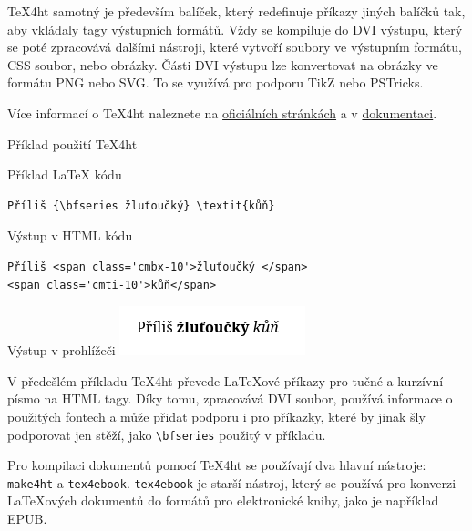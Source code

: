 \TeX4ht samotný je především balíček, který redefinuje příkazy jiných balíčků tak, aby
vkládaly tagy výstupních formátů. Vždy se kompiluje do DVI výstupu, který se poté zpracovává
dalšími nástroji, které vytvoří soubory ve výstupním formátu, CSS soubor, nebo obrázky.
Části DVI výstupu lze konvertovat na obrázky ve formátu PNG nebo SVG. To se využívá pro podporu
TikZ nebo PSTricks.

Více informací o \TeX4ht naleznete na  \href{https://www.tug.org/tex4ht/}{oficiálních stránkách}
a v \href{https://www.kodymirus.cz/tex4ht-doc/tex4ht-doc.html}{dokumentaci}.

\begin{frame}[fragile]{Příklad použití TeX4ht}


\begin{block}{Příklad LaTeX kódu}
\begin{verbatim}
Příliš {\bfseries žluťoučký} \textit{kůň}
\end{verbatim}
\end{block}



\begin{block}{Výstup v HTML kódu}
\begin{verbatim}
Příliš <span class='cmbx-10'>žluťoučký </span>
<span class='cmti-10'>kůň</span>
\end{verbatim}
\end{block}

\begin{block}{Výstup v prohlížeči}
\includegraphics{img/basic.png} 
\end{block}

\end{frame}

V předešlém příkladu \TeX4ht převede LaTeXové příkazy pro tučné a kurzívní písmo na HTML tagy.
Díky tomu, zpracovává DVI soubor, používá informace o použitých fontech a může 
přidat podporu i pro příkazky, které by jinak šly podporovat jen stěží, jako 
\verb|\bfseries| použitý v příkladu.


Pro kompilaci dokumentů pomocí \TeX4ht se používají dva hlavní nástroje: \texttt{make4ht} a \texttt{tex4ebook}.
\texttt{tex4ebook} je starší nástroj, který se používá pro konverzi LaTeXových
dokumentů do formátů pro elektronické knihy, jako je například EPUB. 

